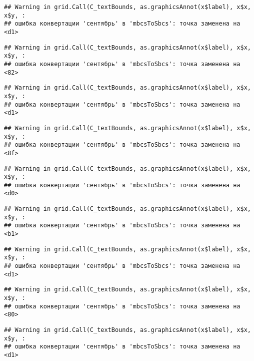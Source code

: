 \documentclass[
]{article}
\begin{document}
\begin{verbatim}
## Warning in grid.Call(C_textBounds, as.graphicsAnnot(x$label), x$x, x$y, :
## ошибка конвертации 'сентябрь' в 'mbcsToSbcs': точка заменена на <d1>
\end{verbatim}

\begin{verbatim}
## Warning in grid.Call(C_textBounds, as.graphicsAnnot(x$label), x$x, x$y, :
## ошибка конвертации 'сентябрь' в 'mbcsToSbcs': точка заменена на <82>
\end{verbatim}

\begin{verbatim}
## Warning in grid.Call(C_textBounds, as.graphicsAnnot(x$label), x$x, x$y, :
## ошибка конвертации 'сентябрь' в 'mbcsToSbcs': точка заменена на <d1>
\end{verbatim}

\begin{verbatim}
## Warning in grid.Call(C_textBounds, as.graphicsAnnot(x$label), x$x, x$y, :
## ошибка конвертации 'сентябрь' в 'mbcsToSbcs': точка заменена на <8f>
\end{verbatim}

\begin{verbatim}
## Warning in grid.Call(C_textBounds, as.graphicsAnnot(x$label), x$x, x$y, :
## ошибка конвертации 'сентябрь' в 'mbcsToSbcs': точка заменена на <d0>
\end{verbatim}

\begin{verbatim}
## Warning in grid.Call(C_textBounds, as.graphicsAnnot(x$label), x$x, x$y, :
## ошибка конвертации 'сентябрь' в 'mbcsToSbcs': точка заменена на <b1>
\end{verbatim}

\begin{verbatim}
## Warning in grid.Call(C_textBounds, as.graphicsAnnot(x$label), x$x, x$y, :
## ошибка конвертации 'сентябрь' в 'mbcsToSbcs': точка заменена на <d1>
\end{verbatim}

\begin{verbatim}
## Warning in grid.Call(C_textBounds, as.graphicsAnnot(x$label), x$x, x$y, :
## ошибка конвертации 'сентябрь' в 'mbcsToSbcs': точка заменена на <80>
\end{verbatim}

\begin{verbatim}
## Warning in grid.Call(C_textBounds, as.graphicsAnnot(x$label), x$x, x$y, :
## ошибка конвертации 'сентябрь' в 'mbcsToSbcs': точка заменена на <d1>
\end{verbatim}
\end{document}
